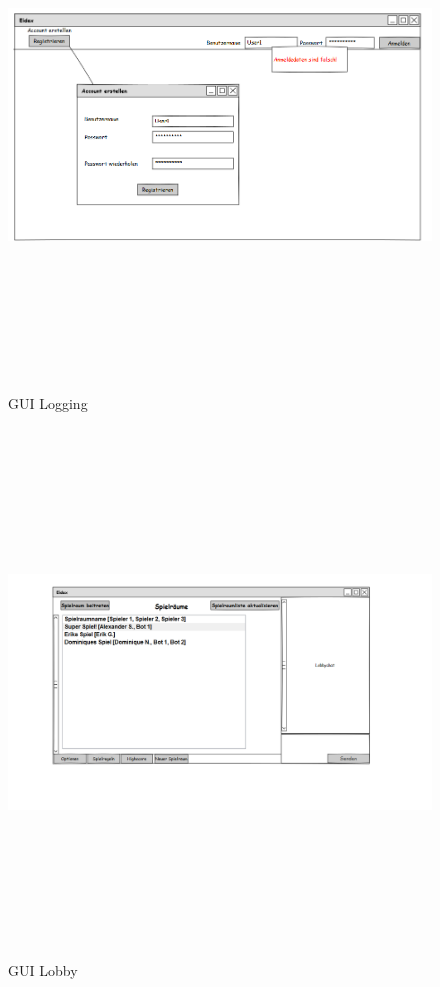 \begin{center}
	\begin{figure}
		\hspace*{-1.75cm}
		\includegraphics[width=170mm, height =140mm]{PencilProjectData/logging5}
		\caption{GUI Logging}
	\end{figure}
	
	\begin{figure}
		\hspace*{-1.5cm}
		\includegraphics[width=170mm, height =140mm]{PencilProjectData/lobby1}
		\caption{GUI Lobby}
	\end{figure}
	

\end{center}
